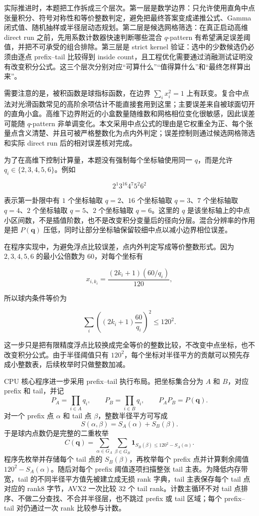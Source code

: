 \documentclass[12pt,a4paper,fontset=none]{ctexart}
\begin{document}
实际推进时，本题把工作拆成三个层次。第一层是数学边界：只允许使用直角中点张量积分、符号对称性和等价整数判定，避免把最终答案变成递推公式、Gamma 闭式值、随机抽样或半径层动态规划。第二层是候选网格筛选：在真正启动高维 direct run 之前，先用系数计数器快速判断哪些混合 \(q\)-pattern 有希望满足误差阈值，并把不可承受的组合排除。第三层是 strict kernel 验证：选中的少数候选仍必须由逐点 prefix--tail 比较得到 inside count，且工程优化需要通过消融测试证明没有改变积分公式。这三个层次分别对应“可算什么”“值得算什么”和“最终怎样算出来”。

需要注意的是，被积函数是球指标函数，在边界
\(\sum_i x_i^2=1\) 上有跃变。复合中点法对光滑函数常见的高阶余项估计不能直接套用到这里；主要误差来自被球面切开的直角小盒。高维下边界附近的小盒数量随维数和网格相位变化很敏感，因此误差可能随 \(q\)-pattern 非单调变化。本文采用中点公式的理由是它权重全为正、每个张量点含义清楚、并且可被严格整数化为点内外判定；误差控制则通过候选网格筛选和实际 direct run 后的相对误差核对完成。

为了在高维下控制计算量，本题没有强制每个坐标轴使用同一 \(q\)，而是允许 \(q_i\in\{2,3,4,5,6\}\)。例如

\[
2^1 3^{16}4^7 5^2 6^2
\]

表示第一卦限中有 \(1\) 个坐标轴取 \(q=2\)、\(16\) 个坐标轴取 \(q=3\)、\(7\) 个坐标轴取 \(q=4\)、\(2\) 个坐标轴取 \(q=5\)、\(2\) 个坐标轴取 \(q=6\)。这里的 \(q\) 是该坐标轴上的中点小区间数，不是插值阶数，也不是改变积分变量后的径向分层。混合分辨率的作用是把
\(P(\mathbf q)\) 压低，同时让部分坐标轴保留较细中点以减小边界相位误差。

在程序实现中，为避免浮点比较误差，点内外判定写成等价整数形式。因为 \(2,3,4,5,6\) 的最小公倍数为 \(60\)，对每个坐标有

\[
x_{i,k_i}=\frac{(2k_i+1)(60/q_i)}{120},
\]

所以球内条件等价为

\[
\sum_i\left((2k_i+1)\frac{60}{q_i}\right)^2\le 120^2.
\]

这一步只是把有限精度浮点比较换成完全等价的整数比较，不改变中点坐标，也不改变积分公式。由于半径阈值只有 \(120^2\)，每个坐标对半径平方的贡献可以预先存成小整数表，后续枚举时只做整数加减。

CPU 核心程序进一步采用 prefix--tail 执行布局。把坐标集合分为
\(A\) 和 \(B\)，对应 prefix 和 tail，并记
\[
P_A=\prod_{i\in A}q_i,\qquad P_B=\prod_{i\in B}q_i,\qquad
P_A P_B=P(\mathbf q).
\]
对一个 prefix 点 \(\alpha\) 和 tail 点 \(\beta\)，整数半径平方可写成
\[
S(\alpha,\beta)=S_A(\alpha)+S_B(\beta).
\]
于是球内点数仍是完整的二重枚举
\[
C(\mathbf q)=
\sum_{\alpha\in G_A}\sum_{\beta\in G_B}
\mathbf{1}_{S_B(\beta)\le 120^2-S_A(\alpha)}.
\]
程序先枚举并存储每个 tail 点的 \(S_B(\beta)\)，再枚举每个 prefix 点并计算剩余阈值
\(120^2-S_A(\alpha)\)。随后对每个 prefix 阈值逐项扫描整张 tail 主表。为降低内存带宽，tail 的不同半径平方值先被建立成无损 rank 字典，tail 主表保存每个 tail 点对应的 rank8 字节，AVX2 一次比较 \(32\) 个 tail rank。计数主循环不对 tail 点排序、不做二分查找、不合并半径层，也不跳过 prefix 或 tail 区域；每个 prefix--tail 对仍通过一次 rank 比较参与计数。
\end{document}
